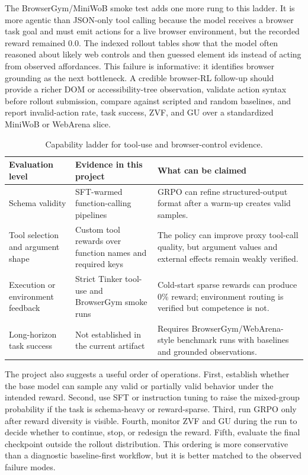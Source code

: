 \documentclass[12pt,a4paper]{report}
\begin{document}
The BrowserGym/MiniWoB smoke test adds one more rung to this ladder. It is more agentic than JSON-only tool calling because the model receives a browser task goal and must emit actions for a live browser environment, but the recorded reward remained 0.0. The indexed rollout tables show that the model often reasoned about likely web controls and then guessed element ids instead of acting from observed affordances. This failure is informative: it identifies browser grounding as the next bottleneck. A credible browser-RL follow-up should provide a richer DOM or accessibility-tree observation, validate action syntax before rollout submission, compare against scripted and random baselines, and report invalid-action rate, task success, ZVF, and GU over a standardized MiniWoB or WebArena slice.

\begin{table}[ht]
\centering
\caption{Capability ladder for tool-use and browser-control evidence.}
\label{tab:agentic-capability-ladder}
\small
\footnotesize
\begin{tabularx}{\textwidth}{p{3.2cm}p{3.9cm}X}
\toprule
Evaluation level & Evidence in this project & What can be claimed\\
\midrule
Schema validity & SFT-warmed function-calling pipelines & GRPO can refine structured-output format after a warm-up creates valid samples.\\
Tool selection and argument shape & Custom tool rewards over function names and required keys & The policy can improve proxy tool-call quality, but argument values and external effects remain weakly verified.\\
Execution or environment feedback & Strict Tinker tool-use and BrowserGym smoke runs & Cold-start sparse rewards can produce 0\% reward; environment routing is verified but competence is not.\\
Long-horizon task success & Not established in the current artifact & Requires BrowserGym/WebArena-style benchmark runs with baselines and grounded observations.\\
\bottomrule
\end{tabularx}
\end{table}

The project also suggests a useful order of operations. First, establish whether the base model can sample any valid or partially valid behavior under the intended reward. Second, use SFT or instruction tuning to raise the mixed-group probability if the task is schema-heavy or reward-sparse. Third, run GRPO only after reward diversity is visible. Fourth, monitor ZVF and GU during the run to decide whether to continue, stop, or redesign the reward. Fifth, evaluate the final checkpoint outside the rollout distribution. This ordering is more conservative than a diagnostic baseline-first workflow, but it is better matched to the observed failure modes.
\end{document}
